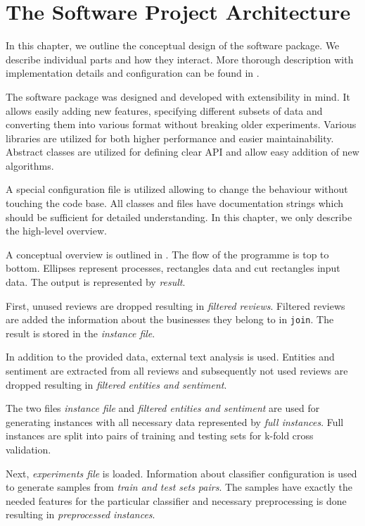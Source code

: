\chapter{The Software Project Architecture}\label{chap:arch}

In this chapter, we outline the conceptual design of the software package.
We describe individual parts and how they interact.
More thorough description with implementation details and configuration can be found in .


The software package was designed and developed with extensibility in mind.
It allows easily adding new features, specifying different subsets of data and converting them into various format without breaking older experiments.
Various libraries are utilized for both higher performance and easier maintainability.
Abstract classes are utilized for defining clear API and allow easy addition of new algorithms.

A special configuration file is utilized allowing to change the behaviour without touching the code base.
All classes and files have documentation strings which should be sufficient for detailed understanding.
In this chapter, we only describe the high-level overview.

A conceptual overview is outlined in .
The flow of the programme is top to bottom.
Ellipses represent processes, rectangles data and cut rectangles input data.
The output is represented by \textit{result}.

First, unused reviews are dropped resulting in \textit{filtered reviews}.
Filtered reviews are added the information about the businesses they belong to in \texttt{join}.
The result is stored in the \textit{instance file}.

In addition to the provided data, external text analysis is used.
Entities and sentiment are extracted from all reviews and
subsequently not used reviews are dropped resulting in \textit{filtered entities and sentiment}.

The two files \textit{instance file} and \textit{filtered entities and sentiment} 
are used for generating instances with all necessary data represented by \textit{full instances}.
Full instances are split into pairs of training and testing sets for k-fold cross validation.

Next, \textit{experiments file} is loaded.
Information about classifier configuration is used to generate samples from \textit{train and test sets pairs}.
The samples have exactly the needed features for the particular classifier and necessary preprocessing is done
resulting in \textit{preprocessed instances}.

